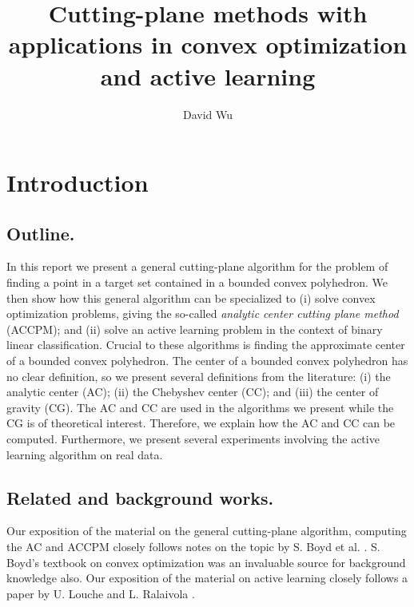 \documentclass[11pt]{amsart}
\theoremstyle{definition}
\theoremstyle{remark}
\begin{document}
\lstset{language=}
\pagestyle{plain}

\title{Cutting-plane methods with applications in convex optimization and active learning}
\author{David Wu}

\maketitle


\section{Introduction}

    \subsection{Outline.}
        In this report we present a general cutting-plane algorithm for the problem of finding a point in a target set contained in a bounded convex polyhedron. We then show how this general algorithm can be specialized to (i) solve convex optimization problems, giving the so-called \emph{analytic center cutting plane method} (ACCPM); and (ii) solve an active learning problem in the context of binary linear classification. Crucial to these algorithms is finding the approximate center of a bounded convex polyhedron. The center of a bounded convex polyhedron has no clear definition, so we present several definitions from the literature: (i) the analytic center (AC); (ii) the Chebyshev center (CC); and (iii) the center of gravity (CG). The AC and CC are used in the algorithms we present while the CG is of theoretical interest. Therefore, we explain how the AC and CC can be computed. Furthermore, we present several experiments involving the active learning algorithm on real data.

    \subsection{Related and background works.}
        Our exposition of the material on the general cutting-plane algorithm, computing the AC and ACCPM closely follows notes on the topic by S. Boyd et al. \cite{BVS08} \cite{BV11} \cite{BDV15}. S. Boyd's textbook on convex optimization \cite{BV04} was an invaluable source for background knowledge also. Our exposition of the material on active learning closely follows a paper by U. Louche and L. Ralaivola \cite{LR15}.
\end{document}
